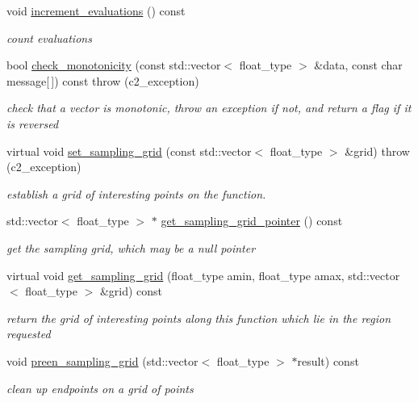 \begin{DoxyCompactItemize}
void \hyperlink{classc2__function_a43555fd6a4ce48f5739e16483170c096}{increment\+\_\+evaluations} () const 
\begin{DoxyCompactList}\small\item\em count evaluations \end{DoxyCompactList}\item 
bool \hyperlink{classc2__function_a8fffb02df5bbff25b0fde67115eae196}{check\+\_\+monotonicity} (const std\+::vector$<$ float\+\_\+type $>$ \&data, const char message\mbox{[}$\,$\mbox{]}) const   throw (c2\+\_\+exception)
\begin{DoxyCompactList}\small\item\em check that a vector is monotonic, throw an exception if not, and return a flag if it is reversed \end{DoxyCompactList}\item 
virtual void \hyperlink{classc2__function_a23828c75121b442899ab7a80cf5abbb0}{set\+\_\+sampling\+\_\+grid} (const std\+::vector$<$ float\+\_\+type $>$ \&grid)  throw (c2\+\_\+exception)
\begin{DoxyCompactList}\small\item\em establish a grid of \textquotesingle{}interesting\textquotesingle{} points on the function. \end{DoxyCompactList}\item 
std\+::vector$<$ float\+\_\+type $>$ $\ast$ \hyperlink{classc2__function_a78b0427521403da116691bab7695906a}{get\+\_\+sampling\+\_\+grid\+\_\+pointer} () const 
\begin{DoxyCompactList}\small\item\em get the sampling grid, which may be a null pointer \end{DoxyCompactList}\item 
virtual void \hyperlink{classc2__function_ad03264dcc015e5d0b1b6eb30df3f32be}{get\+\_\+sampling\+\_\+grid} (float\+\_\+type amin, float\+\_\+type amax, std\+::vector$<$ float\+\_\+type $>$ \&grid) const 
\begin{DoxyCompactList}\small\item\em return the grid of \textquotesingle{}interesting\textquotesingle{} points along this function which lie in the region requested \end{DoxyCompactList}\item 
void \hyperlink{classc2__function_a3f461317f09a62101e6114fd693fa20c}{preen\+\_\+sampling\+\_\+grid} (std\+::vector$<$ float\+\_\+type $>$ $\ast$result) const 
\begin{DoxyCompactList}\small\item\em clean up endpoints on a grid of points \end{DoxyCompactList}\item 

\end{DoxyCompactItemize}

